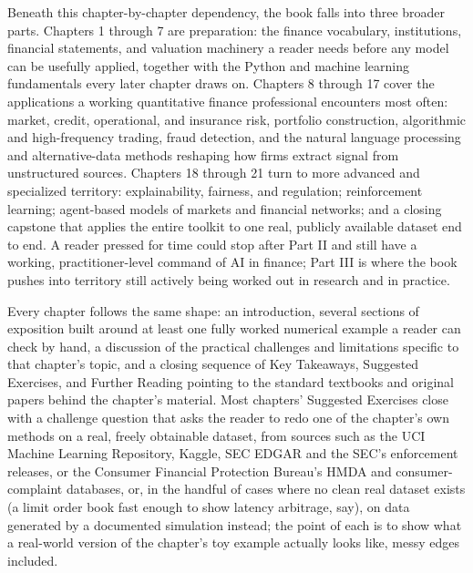 \documentclass{book}
\begin{document}
Beneath this chapter-by-chapter dependency, the book falls into three broader parts. Chapters 1 through 7 are preparation: the finance vocabulary, institutions, financial statements, and valuation machinery a reader needs before any model can be usefully applied, together with the Python and machine learning fundamentals every later chapter draws on. Chapters 8 through 17 cover the applications a working quantitative finance professional encounters most often: market, credit, operational, and insurance risk, portfolio construction, algorithmic and high-frequency trading, fraud detection, and the natural language processing and alternative-data methods reshaping how firms extract signal from unstructured sources. Chapters 18 through 21 turn to more advanced and specialized territory: explainability, fairness, and regulation; reinforcement learning; agent-based models of markets and financial networks; and a closing capstone that applies the entire toolkit to one real, publicly available dataset end to end. A reader pressed for time could stop after Part II and still have a working, practitioner-level command of AI in finance; Part III is where the book pushes into territory still actively being worked out in research and in practice.

Every chapter follows the same shape: an introduction, several sections of exposition built around at least one fully worked numerical example a reader can check by hand, a discussion of the practical challenges and limitations specific to that chapter's topic, and a closing sequence of Key Takeaways, Suggested Exercises, and Further Reading pointing to the standard textbooks and original papers behind the chapter's material. Most chapters' Suggested Exercises close with a challenge question that asks the reader to redo one of the chapter's own methods on a real, freely obtainable dataset, from sources such as the UCI Machine Learning Repository, Kaggle, SEC EDGAR and the SEC's enforcement releases, or the Consumer Financial Protection Bureau's HMDA and consumer-complaint databases, or, in the handful of cases where no clean real dataset exists (a limit order book fast enough to show latency arbitrage, say), on data generated by a documented simulation instead; the point of each is to show what a real-world version of the chapter's toy example actually looks like, messy edges included.
\end{document}
